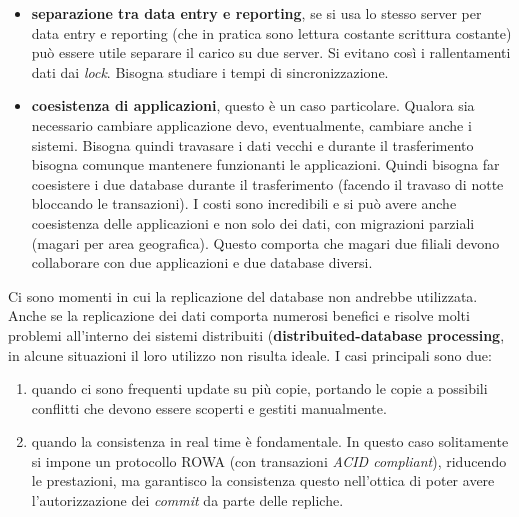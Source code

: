 \begin{itemize}
    \item \textbf{separazione tra data entry e reporting}, se si usa lo stesso server per data entry e reporting (che in pratica sono lettura costante  scrittura costante) può essere utile separare il carico su due server. Si evitano così i rallentamenti dati dai \textit{lock}. Bisogna studiare i tempi di sincronizzazione.
    
    \item \textbf{coesistenza di applicazioni}, questo è un caso particolare. Qualora sia necessario cambiare applicazione devo, eventualmente, cambiare anche i sistemi. Bisogna quindi travasare i dati vecchi e durante il trasferimento bisogna comunque mantenere funzionanti le applicazioni. Quindi bisogna far coesistere i due database durante il trasferimento (facendo il travaso di notte bloccando le transazioni). I costi sono incredibili e si può avere anche coesistenza delle applicazioni e non solo dei dati, con migrazioni parziali (magari per area geografica). Questo comporta che magari due filiali devono collaborare con due applicazioni e due database diversi.
\end{itemize}

Ci sono momenti in cui la replicazione del database non andrebbe utilizzata. Anche se la replicazione dei dati comporta numerosi benefici e risolve molti problemi all'interno dei sistemi distribuiti (\textbf{distribuited-database processing}, in alcune situazioni il loro utilizzo non risulta ideale. I casi principali sono due:
\begin{enumerate}
    \item quando ci sono frequenti update su più copie, portando le copie a possibili conflitti che devono essere scoperti e gestiti manualmente.
    \item quando la consistenza in real time è fondamentale. In questo caso solitamente si impone un protocollo ROWA (con transazioni \textit{ACID compliant}), riducendo le prestazioni, ma garantisco la consistenza questo nell'ottica di poter avere l'autorizzazione dei \textit{commit} da parte delle repliche.
\end{enumerate}

